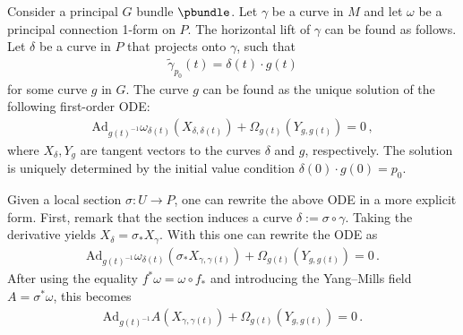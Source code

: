     \begin{method}
        Consider a principal $G$ bundle $\pbundle$. Let $\gamma$ be a curve in $M$ and let $\omega$ be a principal connection 1-form on $P$. The horizontal lift of $\gamma$ can be found as follows. Let $\delta$ be a curve in $P$ that projects onto $\gamma$, such that
        \begin{gather}
            \widetilde\gamma_{p_0}(t)=\delta(t)\cdot g(t)
        \end{gather}
        for some curve $g$ in $G$. The curve $g$ can be found as the unique solution of the following first-order ODE:
        \begin{gather}
            \label{bundle:horizontal_ode}
            \mathrm{Ad}_{g(t)^{-1}}\omega_{\delta(t)}(X_{\delta,\delta(t)}) + \Omega_{g(t)}(Y_{g,g(t)}) = 0\,,
        \end{gather}
        where $X_\delta,Y_g$ are tangent vectors to the curves $\delta$ and $g$, respectively. The solution is uniquely determined by the initial value condition $\delta(0)\cdot g(0)=p_0$.
    \end{method}
    \begin{remark}
        Given a local section $\sigma:U\rightarrow P$, one can rewrite the above ODE in a more explicit form. First, remark that the section induces a curve $\delta:=\sigma\circ\gamma$. Taking the derivative yields $X_\delta=\sigma_*X_\gamma$. With this one can rewrite the ODE as
        \begin{gather}
            \mathrm{Ad}_{g(t)^{-1}}\omega_{\delta(t)}(\sigma_*X_{\gamma,\gamma(t)}) + \Omega_{g(t)}(Y_{g,g(t)}) = 0\,.
        \end{gather}
        After using the equality $f^*\omega=\omega\circ f_*$ and introducing the Yang--Mills field $A=\sigma^*\omega$, this becomes
        \begin{gather}
            \mathrm{Ad}_{g(t)^{-1}}A(X_{\gamma,\gamma(t)}) + \Omega_{g(t)}(Y_{g,g(t)}) = 0\,.
        \end{gather}
    \end{remark}

